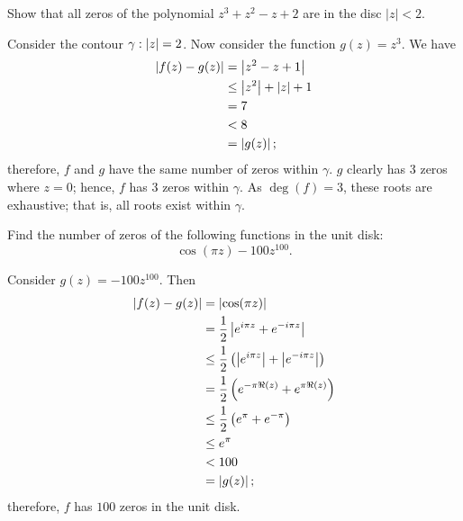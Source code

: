 \setcounter{question}{5}
\question 
Show that all zeros of the polynomial 
$z^3 + z^2 - z + 2$ 
are in the disc $\lvert z \rvert < 2$.
\begin{solution}
    Consider the contour $\gamma: \left\lvert z\right\rvert = 2$.
    Now consider the function $g(z) = z^3$.
    We have
    \begin{align*}
              \left\lvert f(z) - g(z)\right\rvert
        &=    \left\lvert z^2 - z + 1\right\rvert      \\
        &\leq \left\lvert z^2\right\rvert + \left\lvert z\right\rvert + 1 \\
        &=    7                      \\
        &<    8                      \\
        &=    \left\lvert g(z)\right\rvert;
    \end{align*}
    therefore, $f$ and $g$ have the same number of zeros within $\gamma$.
    $g$ clearly has 3 zeros where $z = 0$; hence,
    $f$ has 3 zeros within $\gamma$.
    As $\deg(f) = 3$, these roots are exhaustive;
    that is, all roots exist within $\gamma$.
\end{solution}

\setcounter{question}{6}
\question Find the number of zeros of the following functions in the unit disk:
\[
    \cos(\pi z) - 100z^{100}.
\]
\begin{solution}
    Consider $g(z) = -100 z^{100}$.
    Then
    \begin{align*}
        \left\lvert f(z) - g(z)\right\rvert
        &=    \left\lvert\cos(\pi z)\right\rvert                                         \\
        &=    \frac12 \left\lvert e^{i\pi z} + e^{-i\pi z}\right\rvert                    \\
        &\leq \frac12 \left(\left\lvert e^{i\pi z}\right\rvert + \left\lvert e^{-i\pi z}\right\rvert\right) \\
        &=    \frac12 \left(e^{-\pi \Re(z)} + e^{\pi \Re(z)}\right)     \\
        &\leq \frac12 \left( e^{\pi} + e^{-\pi} \right)                 \\
        &\leq e^{\pi}                                                   \\
        &<    100                                                       \\
        &=    \left\lvert g(z)\right\rvert;
    \end{align*}
    therefore, $f$ has $100$ zeros in the unit disk.
\end{solution}
